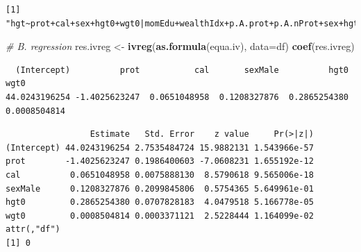 \documentclass[
]{book}
\newenvironment{Shaded}{\begin{snugshade}}{\end{snugshade}}
\newcommand{\CommentTok}[1]{\textcolor[rgb]{0.56,0.35,0.01}{\textit{#1}}}
\newcommand{\DataTypeTok}[1]{\textcolor[rgb]{0.13,0.29,0.53}{#1}}
\newcommand{\KeywordTok}[1]{\textcolor[rgb]{0.13,0.29,0.53}{\textbf{#1}}}
\newcommand{\NormalTok}[1]{#1}
\newcommand{\OperatorTok}[1]{\textcolor[rgb]{0.81,0.36,0.00}{\textbf{#1}}}
\newcommand{\OtherTok}[1]{\textcolor[rgb]{0.56,0.35,0.01}{#1}}
\newcommand{\StringTok}[1]{\textcolor[rgb]{0.31,0.60,0.02}{#1}}
\begin{document}
\begin{verbatim}
[1] "hgt~prot+cal+sex+hgt0+wgt0|momEdu+wealthIdx+p.A.prot+p.A.nProt+sex+hgt0+wgt0"
\end{verbatim}

\begin{Shaded}
\begin{Highlighting}[]
\CommentTok{# B. regression}
\NormalTok{res.ivreg <-}\StringTok{ }\KeywordTok{ivreg}\NormalTok{(}\KeywordTok{as.formula}\NormalTok{(equa.iv), }\DataTypeTok{data=}\NormalTok{df)}
\KeywordTok{coef}\NormalTok{(res.ivreg)}
\end{Highlighting}
\end{Shaded}

\begin{verbatim}
  (Intercept)          prot           cal       sexMale          hgt0          wgt0 
44.0243196254 -1.4025623247  0.0651048958  0.1208327876  0.2865254380  0.0008504814 
\end{verbatim}

\begin{Shaded}
\end{Shaded}

\begin{verbatim}
                 Estimate   Std. Error    z value     Pr(>|z|)
(Intercept) 44.0243196254 2.7535484724 15.9882131 1.543966e-57
prot        -1.4025623247 0.1986400603 -7.0608231 1.655192e-12
cal          0.0651048958 0.0075888130  8.5790618 9.565006e-18
sexMale      0.1208327876 0.2099845806  0.5754365 5.649961e-01
hgt0         0.2865254380 0.0707828183  4.0479518 5.166778e-05
wgt0         0.0008504814 0.0003371121  2.5228444 1.164099e-02
attr(,"df")
[1] 0
\end{verbatim}

\begin{Shaded}
\end{Shaded}
\end{document}
